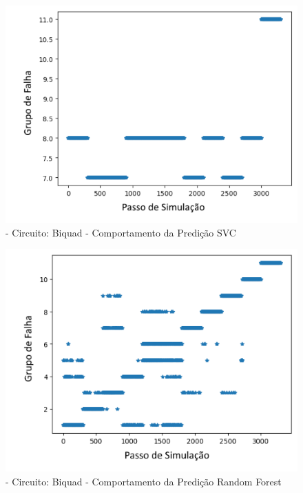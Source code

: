        
        \begin{figure}[H]
        \begin{center}
        \includegraphics[width=13cm]{./01_Pre_textuais/biquad_figs/SVC_Biquad_Highpass_Filter_mc_+_4bitPRBS_[FALHA]raw.png}
        \caption{\label{fig:DecisionTreeClassifieSalenkey}- Circuito: Biquad - Comportamento da Predição SVC}
        \end{center}
        \end{figure}
        
        \begin{figure}[H]
        \begin{center}
        \includegraphics[width=13cm]{./01_Pre_textuais/biquad_figs/RandomForestClassifier_Biquad_Highpass_Filter_mc_+_4bitPRBS_[FALHA]raw.png}
        \caption{\label{fig:DecisionTreeClassifieSalenkey}- Circuito: Biquad - Comportamento da Predição Random Forest }
        \end{center}
        \end{figure}
        
